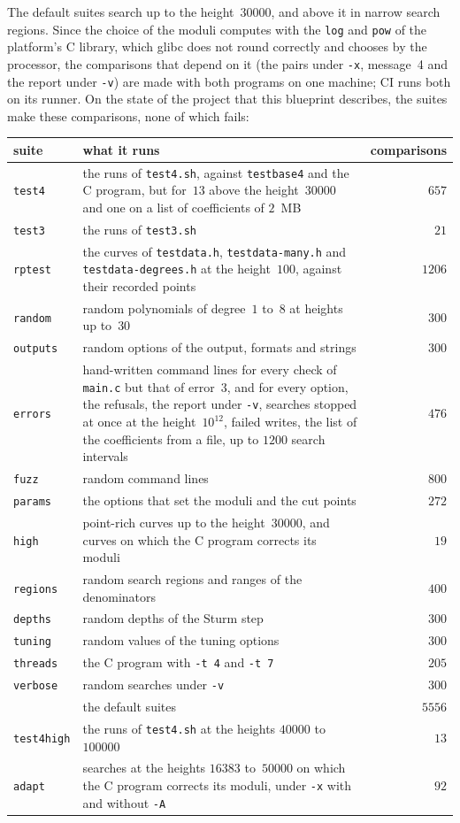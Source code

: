 The default suites search up to the height~$30000$, and above it in narrow search regions. Since the
choice of the moduli computes with the \verb|log| and \verb|pow| of the platform's C library, which
glibc does not round correctly and chooses by the processor, the comparisons that depend on it (the
pairs under \verb|-x|, message~4 and the report under \verb|-v|) are made with both programs on one
machine; CI runs both on its runner. On the state of the project that this blueprint describes, the
suites make these comparisons, none of which fails:
\begin{center}
\small
\begin{tabular}{@{}lp{}r@{}}
  suite & what it runs & comparisons \\
  \hline
  \verb|test4| & the runs of \verb|test4.sh|, against \verb|testbase4| and the C program, but
    for~$13$ above the height~$30000$ and one on a list of coefficients of $2$~MB & $657$ \\
  \verb|test3| & the runs of \verb|test3.sh| & $21$ \\
  \verb|rptest| & the curves of \verb|testdata.h|, \verb|testdata-many.h| and
    \verb|testdata-degrees.h| at the height~$100$, against their recorded points & $1206$ \\
  \verb|random| & random polynomials of degree~$1$ to~$8$ at heights up to~$30$ & $300$ \\
  \verb|outputs| & random options of the output, formats and strings & $300$ \\
  \verb|errors| & hand-written command lines for every check of \verb|main.c| but that of
    error~3, and for every option,
    the refusals, the report under \verb|-v|, searches stopped at once at the height~$10^{12}$,
    failed writes, the list of the coefficients from a file, up to $1200$ search intervals
    & $476$ \\
  \verb|fuzz| & random command lines & $800$ \\
  \verb|params| & the options that set the moduli and the cut points & $272$ \\
  \verb|high| & point-rich curves up to the height~$30000$, and curves on which the C program
    corrects its moduli & $19$ \\
  \verb|regions| & random search regions and ranges of the denominators & $400$ \\
  \verb|depths| & random depths of the Sturm step & $300$ \\
  \verb|tuning| & random values of the tuning options & $300$ \\
  \verb|threads| & the C program with \verb|-t 4| and \verb|-t 7| & $205$ \\
  \verb|verbose| & random searches under \verb|-v| & $300$ \\
  \hline
  & the default suites & $5556$ \\
  \hline
  \verb|test4high| & the runs of \verb|test4.sh| at the heights $40000$ to~$100000$ & $13$ \\
  \verb|adapt| & searches at the heights $16383$ to~$50000$ on which the C program corrects its
    moduli, under \verb|-x| with and without \verb|-A| & $92$ \\
\end{tabular}
\end{center}
